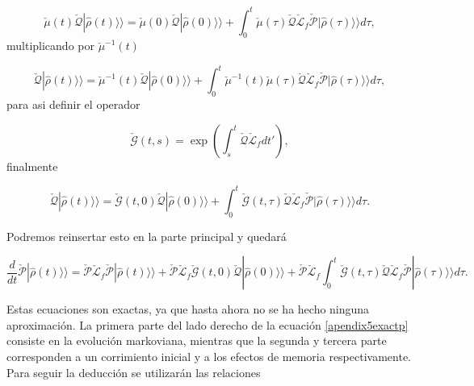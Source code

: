 \begin{appendixs}
\begin{equation*}
    \check{\mu}(t)\check{\mathcal{Q}}|\hat{\rho}(t)\rangle \rangle  = \check{\mu}(0)\check{\mathcal{Q}}|\hat{\rho}(0)\rangle \rangle  + \int_{0}^{t}\check{\mu}(\tau)\check{\mathcal{Q}}\check{\mathcal{L}}_{f} \check{\mathcal{P}}|\hat{\rho}(\tau)\rangle \rangle d\tau,   
\end{equation*}
multiplicando por $\check{\mu}^{-1}(t)$ 

\begin{equation*}
    \check{\mathcal{Q}}|\hat{\rho}(t)\rangle \rangle  = \check{\mu}^{-1}(t)\check{\mathcal{Q}}|\hat{\rho}(0)\rangle \rangle  + \int_{0}^{t}\check{\mu}^{-1}(t)\check{\mu}(\tau)\check{\mathcal{Q}}\check{\mathcal{L}}_{f} \check{\mathcal{P}}|\hat{\rho}(\tau)\rangle \rangle d\tau,    
\end{equation*}
para asi definir el operador

\begin{equation*}
    \check{\mathcal{G}}(t,s) = \exp\left(  \int_{s}^{t}\check{\mathcal{Q}}\check{\mathcal{L}}_{f}dt' \right),
\end{equation*}
finalmente

\begin{equation*}
    \check{\mathcal{Q}}|\hat{\rho}(t)\rangle \rangle = \check{\mathcal{G}}(t,0)\check{\mathcal{Q}}|\hat{\rho}(0)\rangle \rangle  + \int_{0}^{t}\check{\mathcal{G}}(t,\tau)\check{\mathcal{Q}}\check{\mathcal{L}}_{f} \check{\mathcal{P}}|\hat{\rho}(\tau)\rangle \rangle d\tau.    
\end{equation*}

Podremos reinsertar esto en la parte principal y quedará

\begin{equation}
    \frac{d}{dt}\check{\mathcal{P}}|\hat{\rho}(t)\rangle \rangle  = \check{\mathcal{P}}\check{\mathcal{L}}_{f}\check{\mathcal{P}}|\hat{\rho}(t)\rangle \rangle  + \check{\mathcal{P}}\check{\mathcal{L}}_{f}\check{\mathcal{G}}(t,0)\check{\mathcal{Q}}|\hat{\rho}(0)\rangle \rangle  + \check{\mathcal{P}}\check{\mathcal{L}}_{f}\int_{0}^{t}\check{\mathcal{G}}(t,\tau)\check{\mathcal{Q}}\check{\mathcal{L}}_{f} \check{\mathcal{P}}|\hat{\rho}(\tau)\rangle \rangle d\tau.    
    \label{apendix5exactp}
\end{equation}

Estas ecuaciones son exactas, ya que hasta ahora no se ha hecho ninguna aproximación. La primera parte del lado derecho de la ecuación \ref{apendix5exactp} consiste en la evolución markoviana, mientras que la segunda y  tercera parte corresponden a un corrimiento inicial y a los efectos de memoria respectivamente. Para seguir la deducción se utilizarán las relaciones


\end{appendixs}
